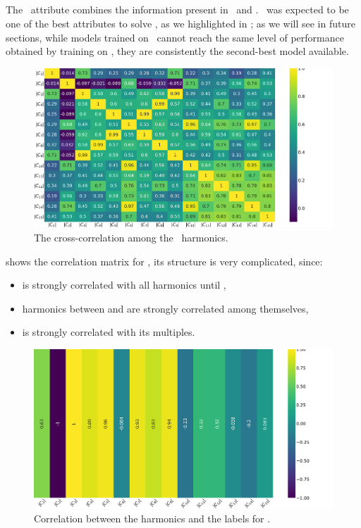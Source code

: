 \subsection{\cnmod}
\label{sec:cnmod}
The \cnmod\ attribute combines the information present in \an\ and \bn. \cnmod\ was expected to be one
of the best attributes to solve \qrp, as we highlighted in ; as we will see in
future sections, while models trained on \cnmod\ cannot reach the same level of performance obtained
by training on \an, they are consistently the second-best model available.
\begin{figure}[!ht]
	\centering
	\includegraphics[width=\linewidth]{img/Cnmod_corr_matrix.png}
	\caption{The cross-correlation among the \cnmod\ harmonics.} \label{fig:cnmod-corr}
\end{figure}

 shows the correlation matrix for \cnmod, its structure is very complicated,
since:
\begin{itemize}
	\item \cnmod[2] is strongly correlated with all harmonics until \cnmod[9],
	\item harmonics between \cnmod[10] and \cnmod[15] are strongly correlated among themselves,
	\item \cnmod[4] is strongly correlated with its multiples.
\end{itemize}
\begin{figure}[!ht]
	\centering
	\includegraphics[width=0.7\linewidth]{img/Cnmod_label_corr.png}
	\caption{Correlation between the harmonics and the labels for \cnmod.} \label{fig:cnmod-lcorr}
\end{figure}

